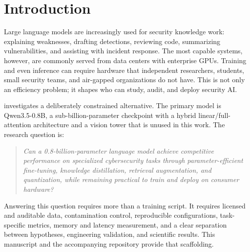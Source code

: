 \section{Introduction}
\label{sec:introduction}

Large language models are increasingly used for security knowledge work:
explaining weaknesses, drafting detections, reviewing code, summarizing
vulnerabilities, and assisting with incident response. The most capable systems,
however, are commonly served from data centers with enterprise GPUs. Training
and even inference can require hardware that independent researchers, students,
small security teams, and air-gapped organizations do not have. This is not only
an efficiency problem; it shapes who can study, audit, and deploy security AI.

\cyberlite{} investigates a deliberately constrained alternative. The primary
model is Qwen3.5-0.8B, a sub-billion-parameter checkpoint with a hybrid
linear/full-attention architecture and a vision tower that is unused in this
work. The research question is:

\begin{quote}
\emph{Can a 0.8-billion-parameter language model achieve competitive performance
on specialized cybersecurity tasks through parameter-efficient fine-tuning,
knowledge distillation, retrieval augmentation, and quantization, while remaining
practical to train and deploy on consumer hardware?}
\end{quote}

Answering this question requires more than a training script. It requires
licensed and auditable data, contamination control, reproducible configurations,
task-specific metrics, memory and latency measurement, and a clear separation
between hypotheses, engineering validation, and scientific results. This
manuscript and the accompanying repository provide that scaffolding.

